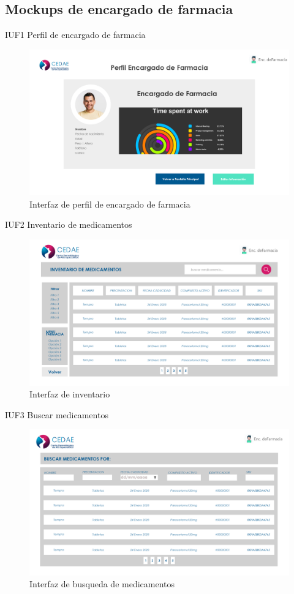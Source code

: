 \documentclass[12pt,letterpaper]{article}
\begin{document}
        \subsection{Mockups de encargado de farmacia}
        IUF1 Perfil de encargado de farmacia
            \begin{figure}[H]
                \centering
                \includegraphics [scale=0.19]{interfaces/far_perfil}
                \caption{Interfaz de perfil de encargado de farmacia}
            \end{figure}
        IUF2 Inventario de medicamentos
            \begin{figure}[H]
                \centering
                \includegraphics [scale=0.18]{interfaces/far_inv_medicamento}
                \caption{Interfaz de inventario}
            \end{figure}
        IUF3 Buscar medicamentos
            \begin{figure}[H]
                \centering
                \includegraphics [scale=0.20]{interfaces/far_bus_medicamento}
                \caption{Interfaz de busqueda de medicamentos}
            \end{figure}
\end{document}
